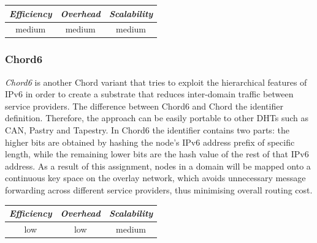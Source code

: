 \begin{center}
\begin{tabular}{ccc}
\emph{Efficiency} & \emph{Overhead} & \emph{Scalability} \\
\hline
medium &
medium &
medium
\end{tabular}
\end{center}

\subsubsection{Chord6}
\emph{Chord6} \cite{XZHL2005} is another Chord variant that tries to
exploit the hierarchical features of IPv6 in order to create a substrate that
reduces inter-domain traffic between service providers. The difference between
Chord6 and Chord the identifier definition. Therefore, the approach can be
easily portable to other DHTs such as CAN, Pastry and Tapestry. In Chord6 the
identifier contains two parts: the higher bits are obtained by hashing the
node's IPv6 address prefix of specific length, while the remaining lower bits
are the hash value of the rest of that IPv6 address. As a result of this
assignment, nodes in a domain will be mapped onto a continuous key space on the
overlay network, which avoids unnecessary message forwarding across different
service providers, thus minimising overall routing cost.

\begin{center}
\begin{tabular}{ccc}
\emph{Efficiency} & \emph{Overhead} & \emph{Scalability} \\
\hline
low &
low &
medium
\end{tabular}
\end{center}

